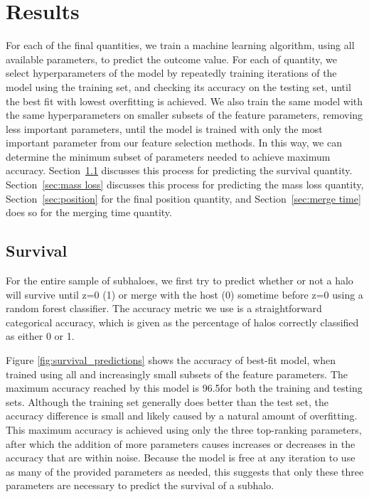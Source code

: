 \documentclass[fleqn,usenatbib]{mnras}
\begin{document}
\section{Results}
\label{sec:Results}
For each of the final quantities, we train a machine learning algorithm, using all available parameters, to predict the outcome value. For each of quantity, we select hyperparameters of the model by repeatedly training iterations of the model using the training set, and checking its accuracy on the testing set, until the best fit with lowest overfitting is achieved. We also train the same model with the same hyperparameters on smaller subsets of the feature parameters, removing less important parameters, until the model is trained with only the most important parameter from our feature selection methods. In this way, we can determine the minimum subset of parameters needed to achieve maximum accuracy. Section~\ref{sec:survival} discusses this process for predicting the survival quantity. Section~\ref{sec:mass loss} discusses this process for predicting the mass loss quantity, Section~\ref{sec:position} for the final position quantity, and Section~\ref{sec:merge time} does so for the merging time quantity.

\subsection{Survival}
\label{sec:survival} %
For the entire sample of subhaloes, we first try to predict whether or not a halo will survive until z=0 (1) or merge with the host (0) sometime before z=0 using a random forest classifier. The accuracy metric we use is a straightforward categorical accuracy, which is given as the percentage of halos correctly classified as either 0 or 1.

Figure \ref{fig:survival_predictions} shows the accuracy of best-fit model, when trained using all and increasingly small subsets of the feature parameters. The maximum accuracy reached by this model is 96.5\percent for both the training and testing sets. Although the training set generally does better than the test set, the accuracy difference is small and likely caused by a natural amount of overfitting. This maximum accuracy is achieved using only the three top-ranking parameters, after which the addition of more parameters causes increases or decreases in the accuracy that are within noise. Because the model is free at any iteration to use as many of the provided parameters as needed, this suggests that only these three parameters are necessary to predict the survival of a subhalo.
\end{document}
